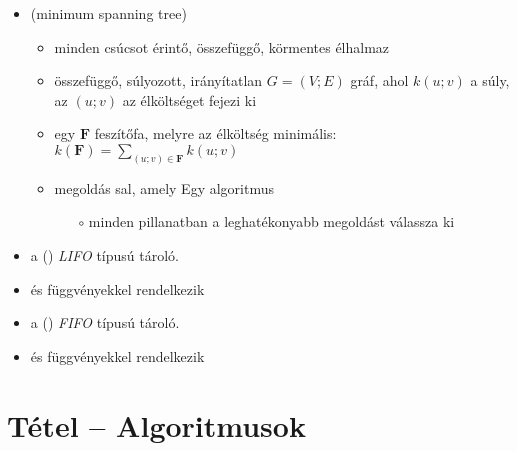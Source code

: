 \documentclass[main.tex]{subfiles}
\begin{document}
\begin{itemize}
    \item {}
    (minimum spanning tree)
    \begin{itemize}
      \item minden csúcsot érintő, összefüggő,
      körmentes élhalmaz

      \item {} összefüggő, súlyozott,
      irányítatlan $G = (V; E)$ gráf, ahol $k(u; v)$
      a súly, az $(u;v)$ az élköltséget fejezi ki

      \item {} egy $\mathbf{F}$ feszítőfa,
      melyre az élköltség minimális:
      $k(\mathbf{F}) = \displaystyle\sum_{(u;v) \in \mathbf{F}} k(u;v)$
      
      \item megoldás sal, amely Egy
       algoritmus
      \begin{itemize}
        \item[$\circ$] minden pillanatban a leghatékonyabb megoldást válassza ki
      \end{itemize}
    \end{itemize}
  \end{itemize}

  \begin{itemize}
    \item a  () \textit{LIFO}
    típusú tároló.

    \item {} és  függvényekkel rendelkezik
  \end{itemize}

  \begin{itemize}
    \item a  () \textit{FIFO}
    típusú tároló.

    \item {} és  függvényekkel rendelkezik
  \end{itemize}


  \section{Tétel – Algoritmusok} %
\end{document}
